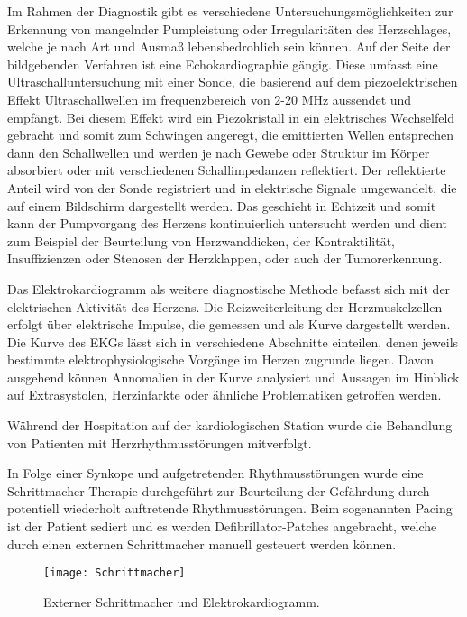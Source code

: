 \documentclass[11pt,a4paper,titlepage]{scrartcl}
\begin{document}
Im Rahmen der Diagnostik gibt es verschiedene Untersuchungsmöglichkeiten zur Erkennung von mangelnder Pumpleistung oder Irregularitäten des Herzschlages, welche je nach Art und Ausmaß lebensbedrohlich sein können.
Auf der Seite der bildgebenden Verfahren ist eine Echokardiographie gängig.
Diese umfasst eine Ultraschalluntersuchung mit einer Sonde, die basierend auf dem piezoelektrischen Effekt Ultraschallwellen im frequenzbereich von 2-20 MHz aussendet und empfängt.
Bei diesem Effekt wird ein Piezokristall in ein elektrisches Wechselfeld gebracht und somit zum Schwingen angeregt, die emittierten Wellen entsprechen dann den Schallwellen und werden je nach Gewebe oder Struktur im Körper absorbiert oder mit verschiedenen Schallimpedanzen reflektiert.
Der reflektierte Anteil wird von der Sonde registriert und in elektrische Signale umgewandelt, die auf einem Bildschirm dargestellt werden.
Das geschieht in Echtzeit und somit kann der Pumpvorgang des Herzens kontinuierlich untersucht werden und dient zum Beispiel der Beurteilung von Herzwanddicken, der Kontraktilität, Insuffizienzen oder Stenosen der Herzklappen, oder auch der Tumorerkennung. \medskip

Das Elektrokardiogramm als weitere diagnostische Methode befasst sich mit der elektrischen Aktivität des Herzens.
Die Reizweiterleitung der Herzmuskelzellen erfolgt über elektrische Impulse, die gemessen und als Kurve dargestellt werden.
Die Kurve des EKGs lässt sich in verschiedene Abschnitte einteilen, denen jeweils bestimmte elektrophysiologische Vorgänge im Herzen zugrunde liegen.
Davon ausgehend können Annomalien in der Kurve analysiert und Aussagen im Hinblick auf Extrasystolen, Herzinfarkte oder ähnliche Problematiken getroffen werden.

Während der Hospitation auf der kardiologischen Station wurde die Behandlung von Patienten mit Herzrhythmusstörungen mitverfolgt. \medskip

In Folge einer Synkope und aufgetretenden Rhythmusstörungen wurde eine Schrittmacher-Therapie durchgeführt zur Beurteilung der Gefährdung durch potentiell wiederholt auftretende Rhythmusstörungen.
Beim sogenannten Pacing ist der Patient sediert und es werden Defibrillator-Patches angebracht, welche durch einen externen Schrittmacher manuell gesteuert werden können.

    \begin{figure}
        \centering
        \texttt{[image: Schrittmacher]}
        \caption{Externer Schrittmacher und Elektrokardiogramm.}
        \label{pacing}
        \centering
        \end{figure}
\end{document}
